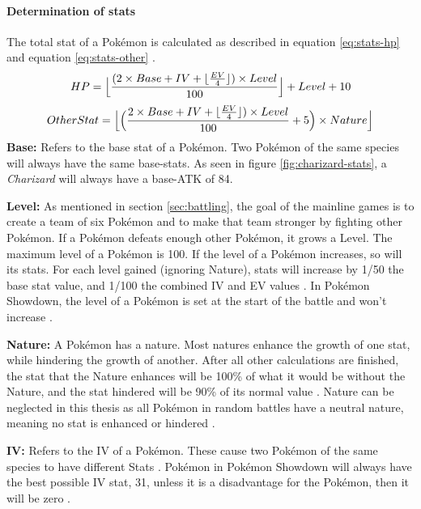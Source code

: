 \paragraph{Determination of stats}
\label{sec:stat-calculation}
The total stat of a Pokémon is calculated as described in equation \ref{eq:stats-hp} and equation 
\ref{eq:stats-other} \cite{Bulbapedia:Stat}.
\begin{equation}
	\label{eq:stats-hp}
	HP = \Bigl\lfloor \frac{(2 \times Base + IV + \lfloor \frac{EV}{4} \rfloor) \times Level}{100}\Bigr\rfloor
	+ Level + 10 \\
\end{equation}
\begin{equation}
	\label{eq:stats-other}
	OtherStat = \Bigl\lfloor \Big( \frac{2 \times Base + IV + \lfloor \frac{EV}{4} \rfloor) \times Level}
	{100} + 5\Big) \times Nature \Bigr\rfloor
\end{equation}
\textbf{Base:} Refers to the base stat of a Pokémon. Two Pokémon of the same species will always have the 
same base-stats. As seen in figure \ref{fig:charizard-stats}, a \textit{Charizard} will always have a
base-\ac{ATK} of 84.

\textbf{Level:} As mentioned in section \ref{sec:battling}, the goal of the mainline games is to create 
a team of six Pokémon and to make that team stronger by fighting other Pokémon. If a Pokémon defeats
enough other Pokémon, it grows a Level. The maximum level of a Pokémon is 100. If the level of a Pokémon
increases, so will its stats. For each level gained (ignoring Nature), stats will increase by 1/50 the
base stat value, and 1/100 the combined \ac{IV} and \ac{EV} values \cite{Bulbapedia:Stat}. 
In Pokémon Showdown, the level of  a Pokémon is set at the start of the battle and won't 
increase \cite{Smogon:RandBatsGuide}.

\textbf{Nature:} A Pokémon has a nature. Most natures enhance the growth of one stat, while hindering
the growth of another. After all other calculations are finished, the stat that the Nature enhances will
be 100\% of what it would be without the Nature, and the stat hindered will be 90\% of its normal value
\cite{Bulbapedia:Stat}. Nature can be neglected in this thesis as all Pokémon in random battles have
a neutral nature, meaning no stat is enhanced or hindered \cite{Smogon:RandBatsGuide}.

\textbf{IV:} Refers to the \ac{IV} of a Pokémon. These cause two Pokémon of the same species to have
different Stats \cite{Bulbapedia:Stat}. Pokémon in Pokémon Showdown will always have the best possible \ac{IV} 
stat, 31, unless it is a disadvantage for the Pokémon, then it will be zero \cite{Smogon:RandBatsGuide}.

